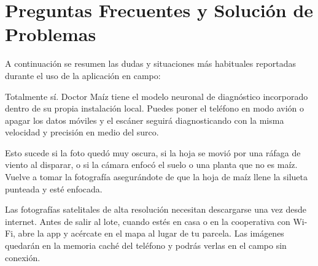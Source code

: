 \documentclass[11pt,a4paper]{report}
\begin{document}
\chapter{Preguntas Frecuentes y Solución de Problemas}

A continuación se resumen las dudas y situaciones más habituales reportadas durante el uso de la aplicación en campo:

\vspace{3mm}
\begin{tcolorbox}[
    enhanced,
    colback=white,
    colframe=MaizPrimary,
    arc=2mm,
    boxrule=1pt,
    title={\textbf{¿Puedo usar la aplicación sin saldo ni señal en el celular?}},
    fonttitle=\sffamily\bfseries\color{white},
    colbacktitle=MaizPrimary,
    top=3mm, bottom=3mm, left=4mm, right=4mm
]
    Totalmente sí. Doctor Maíz tiene el modelo neuronal de diagnóstico incorporado dentro de su propia instalación local. Puedes poner el teléfono en modo avión o apagar los datos móviles y el escáner seguirá diagnosticando con la misma velocidad y precisión en medio del surco.
\end{tcolorbox}

\vspace{1.5mm}
\begin{tcolorbox}[
    enhanced,
    colback=white,
    colframe=MaizPrimary,
    arc=2mm,
    boxrule=1pt,
    title={\textbf{¿Por qué el escáner me muestra el aviso «No Reconocido»?}},
    fonttitle=\sffamily\bfseries\color{white},
    colbacktitle=MaizPrimary,
    top=3mm, bottom=3mm, left=4mm, right=4mm
]
    Esto sucede si la foto quedó muy oscura, si la hoja se movió por una ráfaga de viento al disparar, o si la cámara enfocó el suelo o una planta que no es maíz. Vuelve a tomar la fotografía asegurándote de que la hoja de maíz llene la silueta punteada y esté enfocada.
\end{tcolorbox}

\vspace{1.5mm}
\begin{tcolorbox}[
    enhanced,
    colback=white,
    colframe=MaizPrimary,
    arc=2mm,
    boxrule=1pt,
    title={\textbf{El mapa no muestra las fotos satelitales en el campo. ¿Qué hago?}},
    fonttitle=\sffamily\bfseries\color{white},
    colbacktitle=MaizPrimary,
    top=3mm, bottom=3mm, left=4mm, right=4mm
]
    Las fotografías satelitales de alta resolución necesitan descargarse una vez desde internet. Antes de salir al lote, cuando estés en casa o en la cooperativa con Wi-Fi, abre la app y acércate en el mapa al lugar de tu parcela. Las imágenes quedarán en la memoria caché del teléfono y podrás verlas en el campo sin conexión.
\end{tcolorbox}
\end{document}

